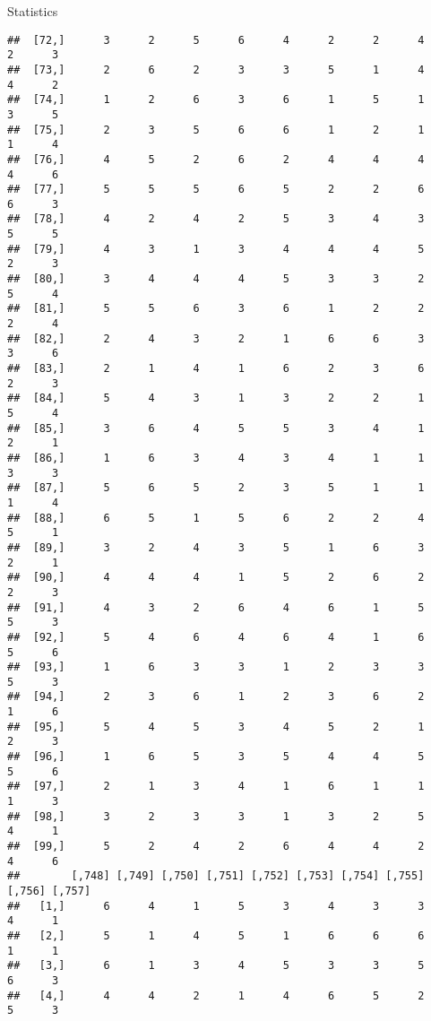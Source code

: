 \documentclass[
  ignorenonframetext,
]{beamer}
\begin{document}
\begin{frame}[fragile]{Statistics}
\begin{verbatim}
##  [72,]      3      2      5      6      4      2      2      4      2      3
##  [73,]      2      6      2      3      3      5      1      4      4      2
##  [74,]      1      2      6      3      6      1      5      1      3      5
##  [75,]      2      3      5      6      6      1      2      1      1      4
##  [76,]      4      5      2      6      2      4      4      4      4      6
##  [77,]      5      5      5      6      5      2      2      6      6      3
##  [78,]      4      2      4      2      5      3      4      3      5      5
##  [79,]      4      3      1      3      4      4      4      5      2      3
##  [80,]      3      4      4      4      5      3      3      2      5      4
##  [81,]      5      5      6      3      6      1      2      2      2      4
##  [82,]      2      4      3      2      1      6      6      3      3      6
##  [83,]      2      1      4      1      6      2      3      6      2      3
##  [84,]      5      4      3      1      3      2      2      1      5      4
##  [85,]      3      6      4      5      5      3      4      1      2      1
##  [86,]      1      6      3      4      3      4      1      1      3      3
##  [87,]      5      6      5      2      3      5      1      1      1      4
##  [88,]      6      5      1      5      6      2      2      4      5      1
##  [89,]      3      2      4      3      5      1      6      3      2      1
##  [90,]      4      4      4      1      5      2      6      2      2      3
##  [91,]      4      3      2      6      4      6      1      5      5      3
##  [92,]      5      4      6      4      6      4      1      6      5      6
##  [93,]      1      6      3      3      1      2      3      3      5      3
##  [94,]      2      3      6      1      2      3      6      2      1      6
##  [95,]      5      4      5      3      4      5      2      1      2      3
##  [96,]      1      6      5      3      5      4      4      5      5      6
##  [97,]      2      1      3      4      1      6      1      1      1      3
##  [98,]      3      2      3      3      1      3      2      5      4      1
##  [99,]      5      2      4      2      6      4      4      2      4      6
##        [,748] [,749] [,750] [,751] [,752] [,753] [,754] [,755] [,756] [,757]
##   [1,]      6      4      1      5      3      4      3      3      4      1
##   [2,]      5      1      4      5      1      6      6      6      1      1
##   [3,]      6      1      3      4      5      3      3      5      6      3
##   [4,]      4      4      2      1      4      6      5      2      5      3

\end{verbatim}
\end{frame}
\end{document}

